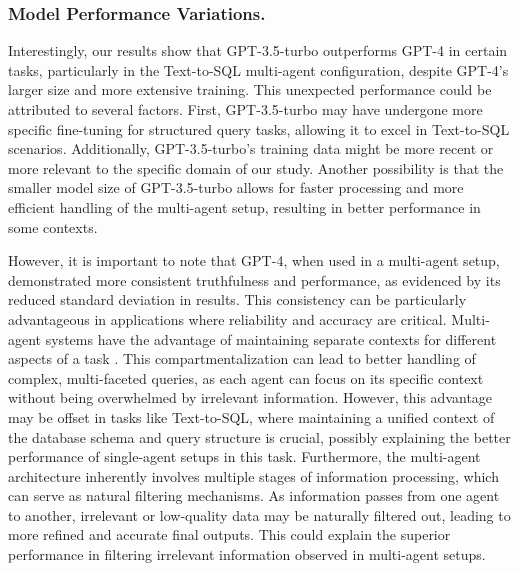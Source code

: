             \subsubsection{Model Performance Variations.}
                Interestingly, our results show that GPT-3.5-turbo outperforms GPT-4 in certain tasks, particularly in the Text-to-SQL multi-agent configuration, despite GPT-4's larger size and more extensive training. 
                This unexpected performance could be attributed to several factors. 
                First, GPT-3.5-turbo may have undergone more specific fine-tuning for structured query tasks, allowing it to excel in Text-to-SQL scenarios. 
                Additionally, GPT-3.5-turbo's training data might be more recent or more relevant to the specific domain of our study. 
                Another possibility is that the smaller model size of GPT-3.5-turbo allows for faster processing and more efficient handling of the multi-agent setup, resulting in better performance in some contexts.

                However, it is important to note that GPT-4, when used in a multi-agent setup, demonstrated more consistent truthfulness and performance, as evidenced by its reduced standard deviation in results. 
                This consistency can be particularly advantageous in applications where reliability and accuracy are critical. 
                Multi-agent systems have the advantage of maintaining separate contexts for different aspects of a task \citep{Langchain2025blogmultiagent}. 
                This compartmentalization can lead to better handling of complex, multi-faceted queries, as each agent can focus on its specific context without being overwhelmed by irrelevant information. However, this advantage may be offset in tasks like Text-to-SQL, where maintaining a unified context of the database schema and query structure is crucial, possibly explaining the better performance of single-agent setups in this task.
                Furthermore, the multi-agent architecture inherently involves multiple stages of information processing, which can serve as natural filtering mechanisms.
                As information passes from one agent to another, irrelevant or low-quality data may be naturally filtered out, leading to more refined and accurate final outputs. 
                This could explain the superior performance in filtering irrelevant information observed in multi-agent setups.
            
